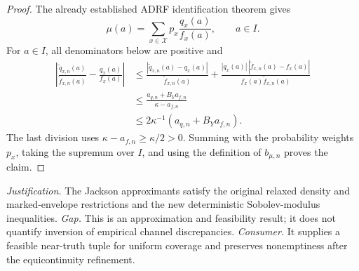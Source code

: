 \documentclass{article}
\begin{document}
\begin{proof}
The already established ADRF identification theorem gives
\[
 \mu(a)=\sum_{x\in\mathcal X}p_x\frac{q_x(a)}{f_x(a)},\qquad a\in I.
\]
For \(a\in I\), all denominators below are positive and
\[
 \begin{aligned}
 \left|\frac{\widetilde q_{x,n}(a)}{\widetilde f_{x,n}(a)}
       -\frac{q_x(a)}{f_x(a)}\right|
 &\le
 \frac{|\widetilde q_{x,n}(a)-q_x(a)|}{\widetilde f_{x,n}(a)}
 +\frac{|q_x(a)|\,|\widetilde f_{x,n}(a)-f_x(a)|}
 {f_x(a)\widetilde f_{x,n}(a)}\\
 &\le\frac{a_{q,n}+B_Ya_{f,n}}{\kappa-a_{f,n}}\\
 &\le2\kappa^{-1}(a_{q,n}+B_Ya_{f,n}).
 \end{aligned}
\]
The last division uses \(\kappa-a_{f,n}\ge\kappa/2>0\). Summing with the probability weights \(p_x\), taking the supremum over \(I\), and using the definition of \(b_{\mu,n}\) proves the claim.
\end{proof}
\par\smallskip\noindent \textit{Justification.} The Jackson approximants satisfy the original relaxed density and marked-envelope restrictions and the new deterministic Sobolev-modulus inequalities. \textit{Gap.} This is an approximation and feasibility result; it does not quantify inversion of empirical channel discrepancies. \textit{Consumer.} It supplies a feasible near-truth tuple for uniform coverage and preserves nonemptiness after the equicontinuity refinement.
\end{document}
